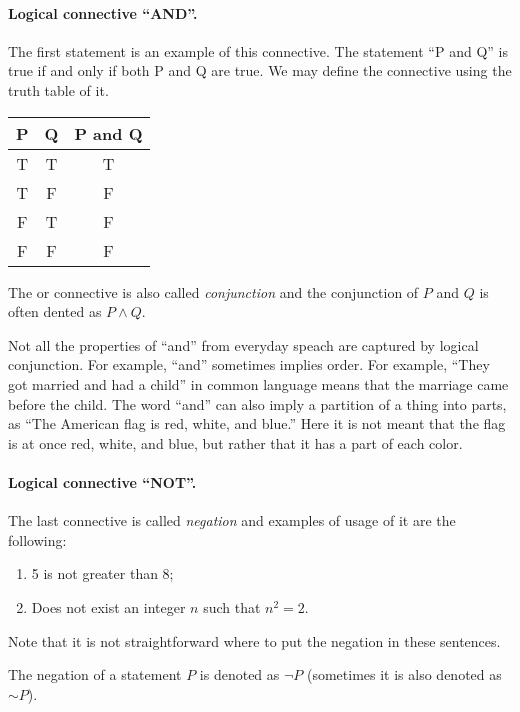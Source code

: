 \paragraph{Logical connective ``AND''.}
The first statement is an example of this connective. The statement ``P and Q''
is true if and only if both P and Q are true. We may define the
connective using the truth table of it.
\begin{center}
  \begin{tabular}{c | c | c}
    P & Q & P and Q \\
    \hline
    T & T & T \\
    T & F & F \\
    F & T & F \\
    F & F & F
  \end{tabular}
\end{center}

The or connective is also called \textit{conjunction} and the conjunction of
$P$ and $Q$ is often dented as $P \land Q$.

\begin{warning}
  Not all the properties of ``and'' from everyday speach are captured by
  logical conjunction. For example, ``and'' sometimes implies order. For
  example, ``They got married and had a child'' in common language means that
  the marriage came before the child. The word ``and'' can also imply a
  partition of a thing into parts, as ``The American flag is red, white, and
  blue.'' Here it is not meant that the flag is at once red, white, and blue,
  but rather that it has a part of each color.
\end{warning}

\paragraph{Logical connective ``NOT''.}
The last connective is called \textit{negation} and examples of usage of it are
the following:
\begin{enumerate}
  \item 5 is not greater than 8;
  \item Does not exist an integer $n$ such that $n^2 = 2$.
\end{enumerate}

Note that it is not straightforward where to put the negation in these
sentences.

The negation of a statement $P$ is denoted as $\lnot P$ (sometimes it is also
denoted as $\sim P$).

